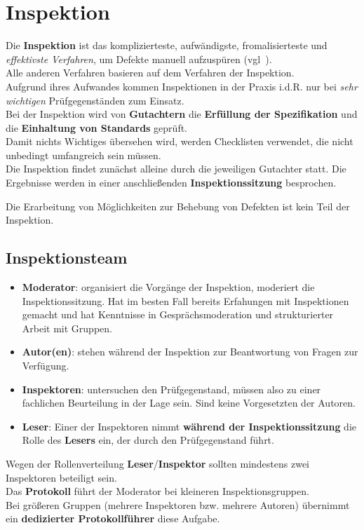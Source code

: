 \section{Inspektion}
Die \textbf{Inspektion} ist das komplizierteste, aufwändigste, fromalisierteste und \textit{effektivste Verfahren}, um Defekte manuell aufzuspüren (vgl~\cite[18]{Wed09c}).\\
Alle anderen Verfahren basieren auf dem Verfahren der Inspektion.\\

\noindent
Aufgrund ihres Aufwandes kommen Inspektionen in der Praxis i.d.R. nur bei \textit{sehr wichtigen} Prüfgegenständen zum Einsatz.\\

\noindent
Bei der Inspektion wird von \textbf{Gutachtern} die \textbf{Erfüllung der Spezifikation} und die \textbf{Einhaltung von Standards} geprüft.\\
Damit nichts Wichtiges übersehen wird, werden Checklisten verwendet, die nicht unbedingt umfangreich sein müssen.\\
Die Inspektion findet zunächst alleine durch die jeweiligen Gutachter statt.
Die Ergebnisse werden in einer anschließenden \textbf{Inspektionssitzung} besprochen.

\begin{tcolorbox}[colback=white]
    Die Erarbeitung von Möglichkeiten zur Behebung von Defekten ist kein Teil der Inspektion.
\end{tcolorbox}

\subsection{Inspektionsteam}

\begin{itemize}
    \item \textbf{Moderator}: organisiert die Vorgänge der Inspektion, moderiert die Inspektionssitzung. Hat im besten Fall bereits Erfahungen mit Inspektionen gemacht und hat Kenntnisse in Gesprächsmoderation und strukturierter Arbeit mit Gruppen.
    \item \textbf{Autor(en)}: stehen während der Inspektion zur Beantwortung von Fragen zur Verfügung.
    \item \textbf{Inspektoren}: untersuchen den Prüfgegenstand, müssen also zu einer fachlichen Beurteilung in der Lage sein. Sind keine Vorgesetzten der Autoren.
    \item \textbf{Leser}: Einer der Inspektoren nimmt \textbf{während der Inspektionssitzung} die Rolle des \textbf{Lesers} ein, der durch den Prüfgegenstand führt.
\end{itemize}

\noindent
Wegen der Rollenverteilung \textbf{Leser}/\textbf{Inspektor} sollten mindestens zwei Inspektoren beteiligt sein.\\

\noindent
Das \textbf{Protokoll} führt der Moderator bei kleineren Inspektionsgruppen.\\
Bei größeren Gruppen (mehrere Inspektoren bzw. mehrere Autoren) übernimmt ein \textbf{dedizierter Protokollführer} diese Aufgabe.